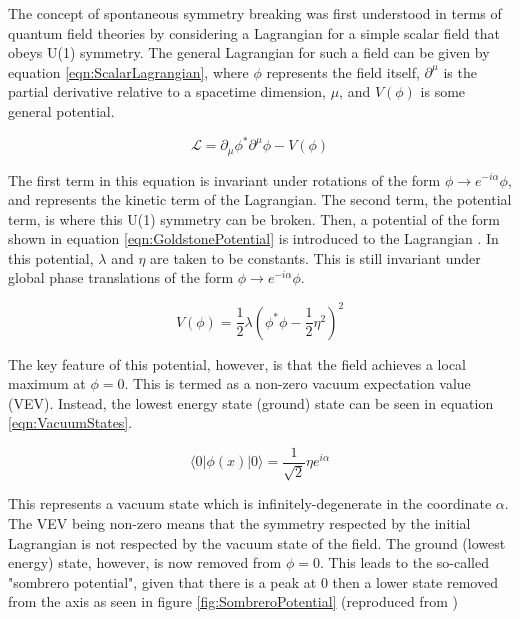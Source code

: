 \documentclass[12pt]{ucsddissertation}
\begin{document}
The concept of spontaneous symmetry breaking was first understood in terms of quantum field theories by considering a Lagrangian for a simple scalar field that obeys U(1) symmetry. The general Lagrangian for such a field can be given by equation \ref{eqn:ScalarLagrangian}, where $\phi$ represents the field itself, $\partial^{\mu}$ is the partial derivative relative to a spacetime dimension, $\mu$, and $V(\phi)$ is some general potential.   

\begin{equation}\label{eqn:ScalarLagrangian}
    \mathcal{L} = \partial_{\mu} \phi^* \partial^{\mu} \phi- V(\phi)
\end{equation}

The first term in this equation is invariant under rotations of the form $\phi \rightarrow e^{-i\alpha}\phi$, and represents the kinetic term of the Lagrangian. The second term, the potential term, is where this U(1) symmetry can be broken. Then, a potential of the form shown in equation \ref{eqn:GoldstonePotential} is introduced to the Lagrangian \cite{EWSymmetryBreaking}. In this potential, $\lambda$ and $\eta$ are taken to be constants. This is still invariant under global phase translations of the form $\phi \rightarrow e^{-i\alpha}\phi$.

\begin{equation}\label{eqn:GoldstonePotential}
    V(\phi) = \frac{1}{2}\lambda (\phi^* \phi - \frac{1}{2}\eta^2)^2
\end{equation}

The key feature of this potential, however, is that the field achieves a local maximum at $\phi = 0$. This is termed as a non-zero vacuum expectation value (VEV). Instead, the lowest energy state (ground) state can be seen in equation \ref{eqn:VacuumStates}.

\begin{equation}\label{eqn:VacuumStates}
    \langle 0 | \phi(x) | 0 \rangle = \frac{1}{\sqrt{2}} \eta e^{i\alpha}
\end{equation}

This represents a vacuum state which is infinitely-degenerate in the coordinate $\alpha$. The VEV being non-zero means that the symmetry respected by the initial Lagrangian is not respected by the vacuum state of the field. The ground (lowest energy) state, however, is now removed from $\phi = 0$. This leads to the so-called "sombrero potential", given that there is a peak at 0 then a lower state removed from the axis as seen in figure \ref{fig:SombreroPotential} (reproduced from \cite{SombreroPotential})
\end{document}
